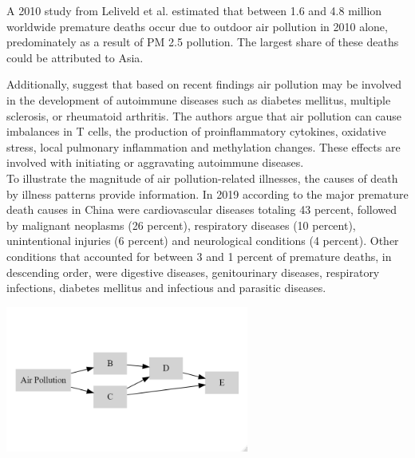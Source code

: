 \documentclass[
]{article}
\begin{document}
	A 2010 study from Leliveld et al. estimated that between 1.6 and 4.8 million worldwide premature deaths occur due to outdoor air pollution in 2010 alone, predominately as a result of PM 2.5 pollution. The largest share of these deaths could be attributed to Asia. 
	
	Additionally, \cite{zhao2019emerging} suggest that based on recent findings air pollution may be involved in the development of autoimmune diseases such as diabetes mellitus, multiple sclerosis, or rheumatoid arthritis. The authors argue that air pollution can cause imbalances in T cells, the production of proinflammatory cytokines, oxidative stress, local pulmonary inflammation and methylation changes. These effects are involved with initiating or aggravating autoimmune diseases. \\ %
	
	To illustrate the magnitude of air pollution-related illnesses, the causes of death by illness patterns provide information. In 2019 according to \cite{who_nodate} the major premature death causes in China were cardiovascular diseases totaling 43 percent, followed by malignant neoplasms (26 percent), respiratory diseases (10 percent), unintentional injuries (6 percent) and neurological conditions (4 percent). Other conditions that accounted for between 3 and 1 percent of premature deaths, in descending order, were digestive diseases, genitourinary diseases, respiratory infections, diabetes mellitus and infectious and parasitic diseases. %
	
	\begin{center}
		\includegraphics[width=0.6\textwidth]{DAG_test.png} 
		\label{fig:dag}
	\end{center}
	
\end{document}
